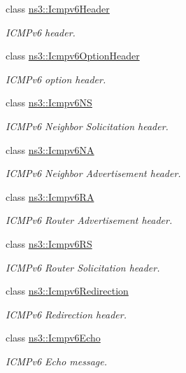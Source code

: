 \begin{DoxyCompactItemize}
\item 
class \hyperlink{classns3_1_1Icmpv6Header}{ns3\+::\+Icmpv6\+Header}
\begin{DoxyCompactList}\small\item\em I\+C\+M\+Pv6 header. \end{DoxyCompactList}\item 
class \hyperlink{classns3_1_1Icmpv6OptionHeader}{ns3\+::\+Icmpv6\+Option\+Header}
\begin{DoxyCompactList}\small\item\em I\+C\+M\+Pv6 option header. \end{DoxyCompactList}\item 
class \hyperlink{classns3_1_1Icmpv6NS}{ns3\+::\+Icmpv6\+NS}
\begin{DoxyCompactList}\small\item\em I\+C\+M\+Pv6 Neighbor Solicitation header. \end{DoxyCompactList}\item 
class \hyperlink{classns3_1_1Icmpv6NA}{ns3\+::\+Icmpv6\+NA}
\begin{DoxyCompactList}\small\item\em I\+C\+M\+Pv6 Neighbor Advertisement header. \end{DoxyCompactList}\item 
class \hyperlink{classns3_1_1Icmpv6RA}{ns3\+::\+Icmpv6\+RA}
\begin{DoxyCompactList}\small\item\em I\+C\+M\+Pv6 Router Advertisement header. \end{DoxyCompactList}\item 
class \hyperlink{classns3_1_1Icmpv6RS}{ns3\+::\+Icmpv6\+RS}
\begin{DoxyCompactList}\small\item\em I\+C\+M\+Pv6 Router Solicitation header. \end{DoxyCompactList}\item 
class \hyperlink{classns3_1_1Icmpv6Redirection}{ns3\+::\+Icmpv6\+Redirection}
\begin{DoxyCompactList}\small\item\em I\+C\+M\+Pv6 Redirection header. \end{DoxyCompactList}\item 
class \hyperlink{classns3_1_1Icmpv6Echo}{ns3\+::\+Icmpv6\+Echo}
\begin{DoxyCompactList}\small\item\em I\+C\+M\+Pv6 Echo message. \end{DoxyCompactList}\item 

\end{DoxyCompactItemize}
